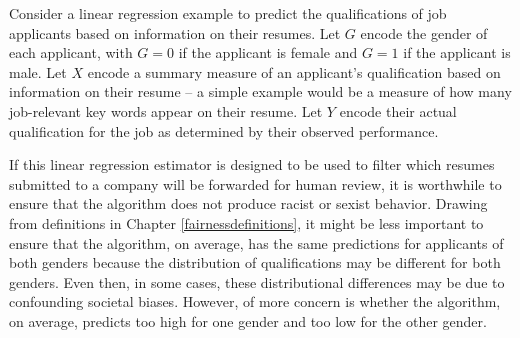 \documentclass[12pt, twoside]{amherstthesis}
\begin{document}
Consider a linear regression example to predict the qualifications of job applicants based on information on their resumes. Let \(G\) encode the gender of each applicant, with \(G=0\) if the applicant is female and \(G=1\) if the applicant is male. Let \(X\) encode a summary measure of an applicant's qualification based on information on their resume -- a simple example would be a measure of how many job-relevant key words appear on their resume. Let \(Y\) encode their actual qualification for the job as determined by their observed performance.

If this linear regression estimator is designed to be used to filter which resumes submitted to a company will be forwarded for human review, it is worthwhile to ensure that the algorithm does not produce racist or sexist behavior. Drawing from definitions in Chapter \ref{fairnessdefinitions}, it might be less important to ensure that the algorithm, on average, has the same predictions for applicants of both genders because the distribution of qualifications may be different for both genders. Even then, in some cases, these distributional differences may be due to confounding societal biases. However, of more concern is whether the algorithm, on average, predicts too high for one gender and too low for the other gender.
\end{document}
